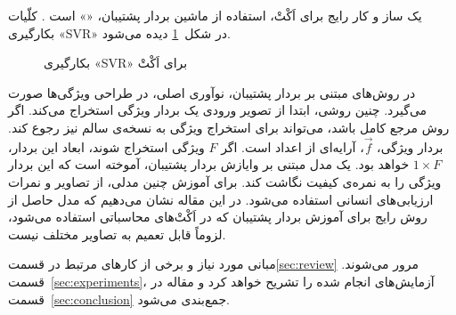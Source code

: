\documentclass[twocolumn]{article}
\begin{document}
یک ساز و کار رایج برای اَکْتْ، استفاده از ماشین بردار پشتیبان، «» \cite{vapnik1999nature} است \cite{cheraaqee}. کلّیات بکارگیری «SVR» در شکل~\ref{fig:svr} دیده می‌شود.
\begin{figure}
	\begin{center}
	\end{center}
	\caption{بکارگیری «SVR» برای اَکْتْ}
	\label{fig:svr}
\end{figure}
در روش‌های مبتنی بر بردار پشتیبان، نوآوری اصلی، در طراحی ویژگی‌ها صورت می‌گیرد. چنین روشی، ابتدا از تصویر ورودی یک بردار ویژگی استخراج می‌کند. اگر روش مرجع کامل باشد، می‌تواند برای استخراج ویژگی به نسخه‌ی سالم نیز رجوع کند. بردار ویژگی، $\vec{f}$، آرایه‌ای از اعداد است. اگر $F$ ویژگی استخراج شوند، ابعاد این بردار، $1\times F$ خواهد بود. یک مدل مبتنی بر وایازش بردار پشتیبان، آموخته است که این بردار ویژگی را به نمره‌ی کیفیت نگاشت کند. برای آموزش چنین مدلی، از تصاویر و نمرات ارزیابی‌های انسانی استفاده می‌شود. در این مقاله نشان می‌دهیم که مدل حاصل از روش رایج برای آموزش بردار پشتیبان که در اَکْتْ‌های محاسباتی استفاده می‌شود، لزوماً قابل تعمیم به تصاویر مختلف نیست.

مبانی مورد نیاز و برخی از کارهای مرتبط در قسمت\ref{sec:review} مرور می‌شوند. قسمت~\ref{sec:experiments}، آزمایش‌های انجام شده را تشریح خواهد کرد و مقاله در قسمت~\ref{sec:conclusion} جمع‌بندی می‌شود.
\end{document}
